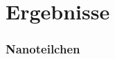 \documentclass{beamer}
\begin{document}
\section{Ergebnisse}

\begin{frame}
\frametitle{Nanoteilchen}
\begin{center}
\begin{figure}
\end{figure}
\end{center}
\end{frame}




\end{document}
